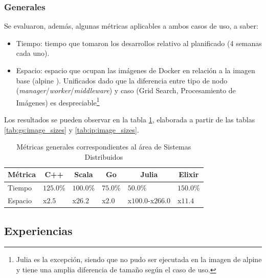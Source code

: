\documentclass[11pt]{article}
\let\Oldsubsection\subsection
\renewcommand{\subsection}{\FloatBarrier\Oldsubsection}
\let\Oldsubsubsection\subsubsection
\renewcommand{\subsubsection}{\FloatBarrier\Oldsubsubsection}
\newcommand{\english}[1]{\textit{#1}}
\begin{document}
\subsubsection{Generales} \label{sec:general_metrics}

Se evaluaron, además, algunas métricas aplicables a ambos casos de uso, a saber:

\begin{itemize}
    \item Tiempo: tiempo que tomaron los desarrollos relativo al planificado (4 semanas cada uno).
    \item Espacio: espacio que ocupan las imágenes de Docker en relación a la imagen base (alpine \cite{metrics:apline}). Unificados dado que la diferencia entre tipo de nodo (\english{manager}/\english{worker}/\english{middleware}) y caso (Grid Search, Procesamiento de Imágenes) es despreciable\footnote{Julia es la excepción, siendo que no pudo ser ejecutada en la imagen de alpine y tiene una amplia diferencia de tamaño según el caso de uso.}
\end{itemize}

Los resultados se pueden observar en la tabla \ref{tab:sis_dist:general_metrics}, elaborada a partir de las tablas \ref{tab:gs:image_sizes} y \ref{tab:ip:image_sizes}.

\begin{table}
\centering
\begin{tabular}{|l|l|l|l|l|l|}
\hline
\multicolumn{1}{|c|}{Métrica} & \multicolumn{1}{c|}{C++} & \multicolumn{1}{c|}{Scala} & \multicolumn{1}{c|}{Go} & \multicolumn{1}{c|}{Julia} & \multicolumn{1}{c|}{Elixir} \\ \hline
Tiempo                        & $125.0$\%                    & $100.0$\%                      & $75.0$\%                    & $50.0$\%                       & $150.0$\%                       \\ \hline
Espacio                       & x$2.5$                     & x$26.2$                      & x$2.0$                      & x$100.0$-x$266.0$                  & x$11.4$                       \\ \hline
\end{tabular}
\caption{Métricas generales correspondientes al área de Sistemas Distribuidos}
\label{tab:sis_dist:general_metrics}
\end{table}

\subsection{Experiencias}
\end{document}
